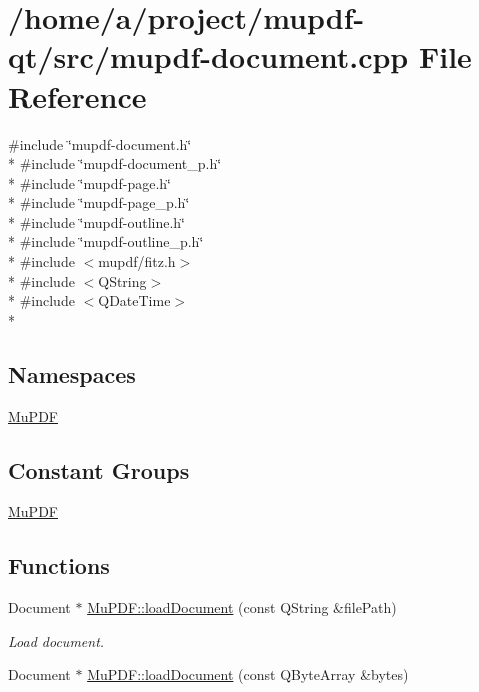 \hypertarget{mupdf-document_8cpp}{\section{/home/a/project/mupdf-\/qt/src/mupdf-\/document.cpp File Reference}
\label{mupdf-document_8cpp}
}
{\ttfamily \#include \char`\"{}mupdf-\/document.\-h\char`\"{}}\\*
{\ttfamily \#include \char`\"{}mupdf-\/document\-\_\-p.\-h\char`\"{}}\\*
{\ttfamily \#include \char`\"{}mupdf-\/page.\-h\char`\"{}}\\*
{\ttfamily \#include \char`\"{}mupdf-\/page\-\_\-p.\-h\char`\"{}}\\*
{\ttfamily \#include \char`\"{}mupdf-\/outline.\-h\char`\"{}}\\*
{\ttfamily \#include \char`\"{}mupdf-\/outline\-\_\-p.\-h\char`\"{}}\\*
{\ttfamily \#include $<$mupdf/fitz.\-h$>$}\\*
{\ttfamily \#include $<$Q\-String$>$}\\*
{\ttfamily \#include $<$Q\-Date\-Time$>$}\\*
\subsection*{Namespaces}
\begin{DoxyCompactItemize}
\item 
\hyperlink{namespace_mu_p_d_f}{Mu\-P\-D\-F}
\end{DoxyCompactItemize}
\subsection*{Constant Groups}
\begin{DoxyCompactItemize}
\item 
\hyperlink{namespace_mu_p_d_f}{Mu\-P\-D\-F}
\end{DoxyCompactItemize}
\subsection*{Functions}
\begin{DoxyCompactItemize}
\item 
Document $\ast$ \hyperlink{namespace_mu_p_d_f_a5cf746094bc9648aca0d4a83e3ac44b3}{Mu\-P\-D\-F\-::load\-Document} (const Q\-String \&file\-Path)
\begin{DoxyCompactList}\small\item\em Load document. \end{DoxyCompactList}\item 
Document $\ast$ \hyperlink{namespace_mu_p_d_f_a294a09188a3dcab290679752dfc8d52b}{Mu\-P\-D\-F\-::load\-Document} (const Q\-Byte\-Array \&bytes)
\end{DoxyCompactItemize}
